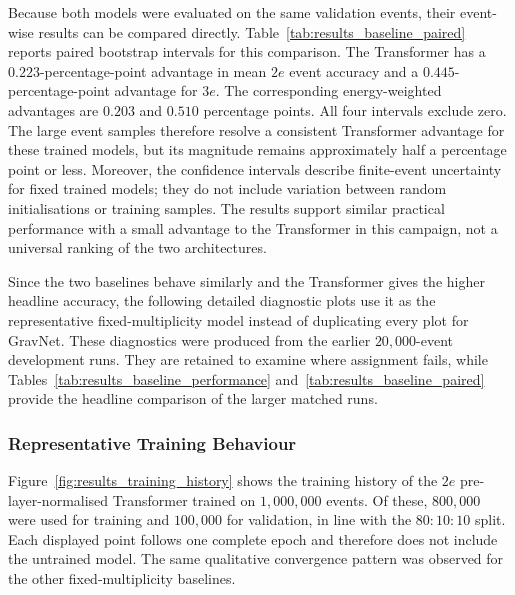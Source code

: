 

Because both models were evaluated on the same validation events, their
event-wise results can be compared directly. Table~\ref{tab:results_baseline_paired}
reports paired bootstrap intervals for this comparison. The Transformer has a
\(0.223\)-percentage-point advantage in mean \(2e\) event accuracy and a
\(0.445\)-percentage-point advantage for \(3e\). The corresponding
energy-weighted advantages are \(0.203\) and \(0.510\) percentage points. All
four intervals exclude zero. The large event samples therefore resolve a
consistent Transformer advantage for these trained models, but its magnitude
remains approximately half a percentage point or less. Moreover, the
confidence intervals describe finite-event uncertainty for fixed trained
models; they do not include variation between random initialisations or
training samples. The results support similar practical performance with a
small advantage to the Transformer in this campaign, not a universal ranking
of the two architectures.



Since the two baselines behave similarly and the Transformer gives the higher
headline accuracy, the following detailed diagnostic plots use it as the
representative fixed-multiplicity model instead of duplicating every plot for
GravNet. These diagnostics were produced from the earlier
\(20{,}000\)-event development runs. They are retained to examine where
assignment fails, while Tables~\ref{tab:results_baseline_performance}
and~\ref{tab:results_baseline_paired} provide the headline comparison of the
larger matched runs.

\clearpage

\subsubsection{Representative Training Behaviour}

Figure~\ref{fig:results_training_history} shows the training history of the
\(2e\) pre-layer-normalised Transformer trained on \(1{,}000{,}000\) events.
Of these, \(800{,}000\) were used for training and \(100{,}000\) for
validation, in line with the \(80{:}10{:}10\) split. Each displayed point
follows one complete epoch and therefore does
not include the untrained model. The same qualitative convergence pattern was
observed for the other fixed-multiplicity baselines.

